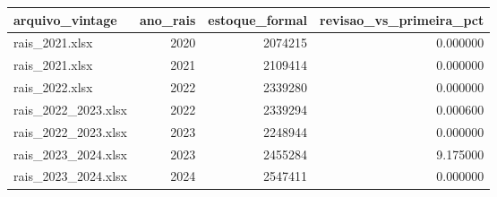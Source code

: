 \begin{tabular}{lrrr}
\toprule
arquivo_vintage & ano_rais & estoque_formal & revisao_vs_primeira_pct \\
\midrule
rais_2021.xlsx & 2020 & 2074215 & 0.000000 \\
rais_2021.xlsx & 2021 & 2109414 & 0.000000 \\
rais_2022.xlsx & 2022 & 2339280 & 0.000000 \\
rais_2022_2023.xlsx & 2022 & 2339294 & 0.000600 \\
rais_2022_2023.xlsx & 2023 & 2248944 & 0.000000 \\
rais_2023_2024.xlsx & 2023 & 2455284 & 9.175000 \\
rais_2023_2024.xlsx & 2024 & 2547411 & 0.000000 \\
\bottomrule
\end{tabular}
